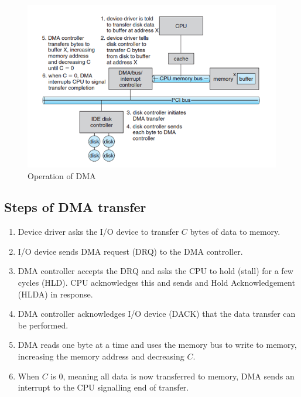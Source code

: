 \documentclass{article}
\theoremstyle{plain}
\theoremstyle{definition}
\begin{document}
\begin{figure}[!h]
    \centering
    \includegraphics[scale=0.8]{os2.png}
    \caption{Operation of DMA}
    \label{fig:my_label_2}
\end{figure}

\subsection{Steps of DMA transfer}
    \begin{enumerate}
        \item Device driver asks the I/O device to transfer $C$ bytes of data to memory. 
        
        \item I/O device sends DMA request (DRQ) to the DMA controller. 
        
        \item DMA controller accepts the DRQ and asks the CPU to hold (stall) for a few cycles (HLD). CPU acknowledges this and sends and Hold Acknowledgement (HLDA) in response. 
        
        \item DMA controller acknowledges I/O device (DACK) that the data transfer can be performed. 
        
        \item DMA reads one byte at a time and uses the memory bus to write to memory, increasing the memory address and decreasing $C$. 
        
        \item When $C$ is 0, meaning all data is now transferred to memory, DMA sends an interrupt to the CPU signalling end of transfer. 
    \end{enumerate}
\end{document}
